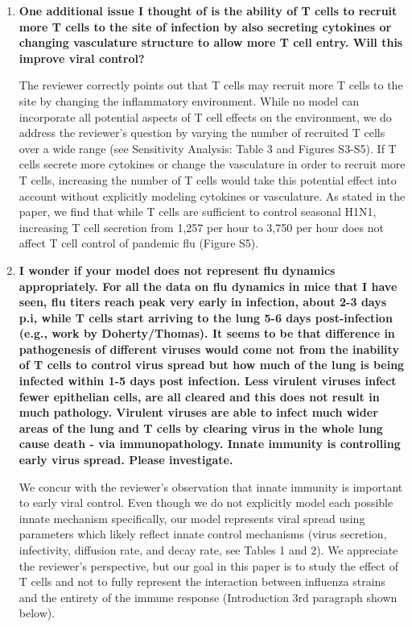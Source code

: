 \documentclass[10pt]{article}
\newenvironment{response}{\fontfamily{cms}\selectfont\small}{\par}
\begin{document}
\begin{enumerate}
\item \textbf{One additional issue I thought of is the ability of T cells to recruit more T cells to the site of infection by also secreting cytokines or changing vasculature structure to allow more T cell entry. Will this improve viral control?}

\begin{response}
The reviewer correctly points out that T cells may recruit more T cells to the site by changing the inflammatory environment. While no model can incorporate all potential aspects of T cell effects on the environment, we do address the reviewer's question by varying the number of recruited T cells over a wide range (see Sensitivity Analysis: Table 3 and Figures S3-S5). If T cells secrete more cytokines or change the vasculature in order to recruit more T cells, increasing the number of T cells would take this potential effect into account without explicitly modeling cytokines or vasculature.  As stated in the paper, we find that while T cells are sufficient to control seasonal H1N1,  increasing T cell secretion from 1,257 per hour to  3,750 per hour does not affect T cell control of pandemic flu (Figure S5).
\end{response}

\item \textbf{I wonder if your model does not represent flu dynamics appropriately. For all the data on flu dynamics in mice that I have seen, flu titers reach peak very early in infection, about 2-3 days p.i, while T cells start arriving to the lung 5-6 days post-infection (e.g., work by Doherty/Thomas). It seems to be that difference in pathogenesis of different viruses would come not from the inability of T cells to control virus spread but how much of the lung is being infected within 1-5 days post infection. Less virulent viruses infect fewer epithelian cells, are all cleared and this does not result in much pathology. Virulent viruses are able to infect much wider areas of the lung and T cells by clearing virus in the whole lung cause death - via immunopathology. Innate immunity is controlling early virus spread. Please investigate.}

\begin{response}
We concur with the reviewer's observation that innate immunity is important to early viral control. Even though we do not explicitly model each possible innate mechanism specifically, our model represents viral spread using parameters which likely reflect innate control mechanisms (virus secretion, infectivity, diffusion rate, and decay rate, see Tables 1 and 2). We appreciate the reviewer's perspective, but our goal in this paper is to study the effect of T cells and not to fully represent the interaction between influenza strains and the entirety of the immune response (Introduction 3rd paragraph shown below).  


\end{response}
\end{enumerate}
\end{document}
